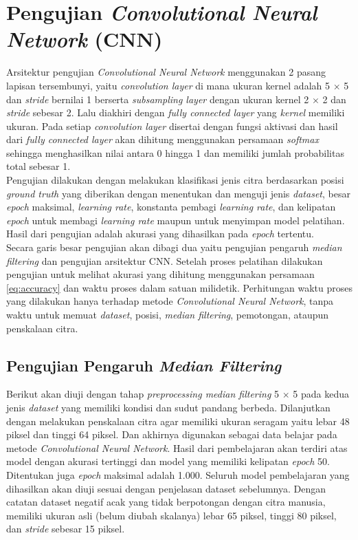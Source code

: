 \section{Pengujian \textit{Convolutional Neural Network} (CNN)}
\noindent Arsitektur pengujian \textit{Convolutional Neural Network} menggunakan 2 pasang lapisan tersembunyi, yaitu \textit{convolution layer} di mana ukuran kernel adalah 5 $\times$ 5 dan \textit{stride} bernilai 1 berserta \textit{subsampling layer} dengan ukuran kernel 2 $\times$ 2 dan \textit{stride} sebesar 2. Lalu diakhiri dengan \textit{fully connected layer} yang \textit{kernel} memiliki ukuran. Pada setiap \textit{convolution layer} disertai dengan fungsi aktivasi dan hasil dari \textit{fully connected layer} akan dihitung menggunakan persamaan \textit{softmax} sehingga menghasilkan nilai antara 0 hingga 1 dan memiliki jumlah probabilitas total sebesar 1. \\
\noindent Pengujian dilakukan dengan melakukan klasifikasi jenis citra berdasarkan posisi \textit{ground truth} yang diberikan dengan menentukan dan menguji jenis \textit{dataset}, besar \textit{epoch} maksimal, \textit{learning rate}, konstanta pembagi \textit{learning rate}, dan kelipatan \textit{epoch} untuk membagi \textit{learning rate} maupun untuk menyimpan model pelatihan. Hasil dari pengujian adalah akurasi yang dihasilkan pada \textit{epoch} tertentu.\\
\noindent Secara garis besar pengujian akan dibagi dua yaitu pengujian pengaruh \textit{median filtering} dan pengujian arsitektur CNN. Setelah proses pelatihan dilakukan pengujian untuk melihat akurasi yang dihitung menggunakan persamaan \ref{eq:accuracy} dan waktu proses dalam satuan milidetik. Perhitungan waktu proses yang dilakukan hanya terhadap metode \textit{Convolutional Neural Network}, tanpa waktu untuk memuat \textit{dataset}, posisi, \textit{median filtering}, pemotongan, ataupun penskalaan citra.\\

\subsection{Pengujian Pengaruh \textit{Median Filtering}}
\noindent Berikut akan diuji dengan tahap \textit{preprocessing median filtering} 5 $\times$ 5 pada kedua jenis \textit{dataset} yang memiliki kondisi dan sudut pandang berbeda. Dilanjutkan dengan melakukan penskalaan citra agar memiliki ukuran seragam yaitu lebar 48 piksel dan tinggi 64 piksel. Dan akhirnya digunakan sebagai data belajar pada metode \textit{Convolutional Neural Network}. Hasil dari pembelajaran akan terdiri atas model dengan akurasi tertinggi dan model yang memiliki kelipatan \textit{epoch} 50. Ditentukan juga \textit{epoch} maksimal adalah 1.000. Seluruh model pembelajaran yang dihasilkan akan diuji sesuai dengan penjelasan dataset sebelumnya. Dengan catatan dataset negatif acak yang tidak berpotongan dengan citra manusia, memiliki ukuran asli (belum diubah skalanya) lebar 65 piksel, tinggi 80 piksel, dan \textit{stride} sebesar 15 piksel.\\

